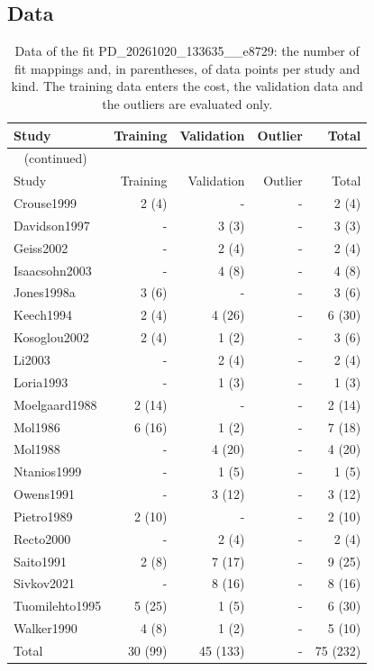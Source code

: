 \subsection{Data}

\begin{longtable}{lrrrr}
\caption{Data of the fit PD\_20261020\_133635\_\_e8729: the number of fit mappings and, in parentheses, of data points per study and kind. The training data enters the cost, the validation data and the outliers are evaluated only.}\label{tab:data:PD_20261020_133635__e8729} \\
\toprule
Study & Training & Validation & Outlier & Total \\
\midrule
\endfirsthead
\multicolumn{5}{l}{\small\tablename~\thetable{} (continued)} \\
\toprule
Study & Training & Validation & Outlier & Total \\
\midrule
\endhead
\bottomrule
\endlastfoot
Crouse1999 & 2 (4) & - & - & 2 (4) \\
Davidson1997 & - & 3 (3) & - & 3 (3) \\
Geiss2002 & - & 2 (4) & - & 2 (4) \\
Isaacsohn2003 & - & 4 (8) & - & 4 (8) \\
Jones1998a & 3 (6) & - & - & 3 (6) \\
Keech1994 & 2 (4) & 4 (26) & - & 6 (30) \\
Kosoglou2002 & 2 (4) & 1 (2) & - & 3 (6) \\
Li2003 & - & 2 (4) & - & 2 (4) \\
Loria1993 & - & 1 (3) & - & 1 (3) \\
Moelgaard1988 & 2 (14) & - & - & 2 (14) \\
Mol1986 & 6 (16) & 1 (2) & - & 7 (18) \\
Mol1988 & - & 4 (20) & - & 4 (20) \\
Ntanios1999 & - & 1 (5) & - & 1 (5) \\
Owens1991 & - & 3 (12) & - & 3 (12) \\
Pietro1989 & 2 (10) & - & - & 2 (10) \\
Recto2000 & - & 2 (4) & - & 2 (4) \\
Saito1991 & 2 (8) & 7 (17) & - & 9 (25) \\
Sivkov2021 & - & 8 (16) & - & 8 (16) \\
Tuomilehto1995 & 5 (25) & 1 (5) & - & 6 (30) \\
Walker1990 & 4 (8) & 1 (2) & - & 5 (10) \\
Total & 30 (99) & 45 (133) & - & 75 (232) \\
\end{longtable}

